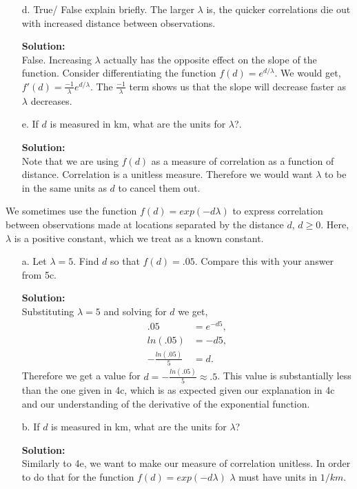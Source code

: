 \documentclass[12pt]{article}
\makeatletter
\theoremstyle{homework}
\newenvironment{exercise}[1]
{\def\@currentlabel{#1}\exercisecore}
{\endexercisecore}
\newcommand{\localhead}[1]{\par\smallskip\noindent\textbf{#1}\nobreak\\}%
\newcommand\solution{\localhead{Solution:}}
\makeatother
\begin{document}
\begin{exercise}{5}
\begin{enumerate}
    \item[d.] True/ False explain briefly. The larger $\lambda$ is, the quicker correlations die out with increased distance between observations. \\
    \solution False. Increasing $\lambda$ actually has the opposite effect on the slope of the function. Consider differentiating the function $f(d) = e^{d/\lambda}$. 
    We would get, $f'(d) = \frac{-1}{\lambda} e^{d/\lambda}$. The $\frac{-1}{\lambda}$ term shows us that the slope will decrease faster as $\lambda$ decreases. 
    \vspace{.15in}

    \item[e.] If $d$ is measured in km, what are the units for $\lambda$?.\\
    \solution Note that we are using $f(d)$ as a measure of correlation as a function of distance. Correlation is a unitless measure. Therefore we would want 
    $\lambda$ to be in the same units as $d$ to cancel them out.   
  \end{enumerate}
\end{exercise}
\vspace{1in}

\begin{exercise}{6} We sometimes use the function $f(d) = exp(-d\lambda)$ to express correlation between observations made at locations 
  separated by the distance $d$, $d \geq 0$. Here, $\lambda$ is a positive constant, which we treat as a known constant.\\
  \begin{enumerate}
    \item[a.] Let $\lambda = 5$. Find $d$ so that $f(d) = .05$. Compare this with your answer from 5c. \\
    \solution  Substituting $\lambda = 5$ and solving for $d$ we get, 
    \begin{align*}
      .05 &= e^{-d5},\\
      ln(.05) &= -d5,\\
      -\frac{ln(.05)}{5} &= d.
    \end{align*}
    Therefore we get a value for $d = -\frac{ln(.05)}{5} \approx .5$. This value is substantially less than the one given in 4c, which is as expected given 
    our explanation in 4c and our understanding of the derivative of the exponential function. \\
    \vspace{.15in}



    \item[b.] If $d$ is measured in km, what are the units for $\lambda$?\\
    \solution Similarly to 4e, we want to make our measure of correlation unitless. In order to do that for the function $f(d) = exp(-d\lambda)$
    $\lambda$ must have units in $1/km$. 
  \end{enumerate}
\end{exercise}
\vspace{1in}
\end{document}
